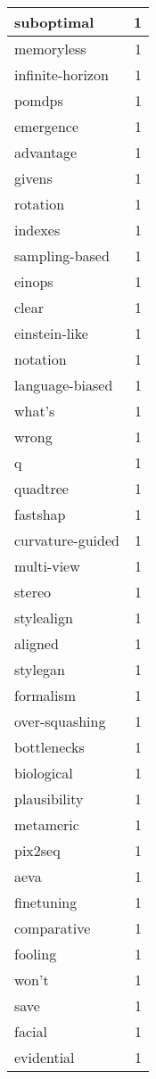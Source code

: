 \begin{table}[h]
\begin{tabular}{|l|r|}
\hline
suboptimal & 1 \\
\hline
memoryless & 1 \\
\hline
infinite-horizon & 1 \\
\hline
pomdps & 1 \\
\hline
emergence & 1 \\
\hline
advantage & 1 \\
\hline
givens & 1 \\
\hline
rotation & 1 \\
\hline
indexes & 1 \\
\hline
sampling-based & 1 \\
\hline
einops & 1 \\
\hline
clear & 1 \\
\hline
einstein-like & 1 \\
\hline
notation & 1 \\
\hline
language-biased & 1 \\
\hline
what’s & 1 \\
\hline
wrong & 1 \\
\hline
q & 1 \\
\hline
quadtree & 1 \\
\hline
fastshap & 1 \\
\hline
curvature-guided & 1 \\
\hline
multi-view & 1 \\
\hline
stereo & 1 \\
\hline
stylealign & 1 \\
\hline
aligned & 1 \\
\hline
stylegan & 1 \\
\hline
formalism & 1 \\
\hline
over-squashing & 1 \\
\hline
bottlenecks & 1 \\
\hline
biological & 1 \\
\hline
plausibility & 1 \\
\hline
metameric & 1 \\
\hline
pix2seq & 1 \\
\hline
aeva & 1 \\
\hline
finetuning & 1 \\
\hline
comparative & 1 \\
\hline
fooling & 1 \\
\hline
won’t & 1 \\
\hline
save & 1 \\
\hline
facial & 1 \\
\hline
evidential & 1 \\

\end{tabular}
\end{table}
